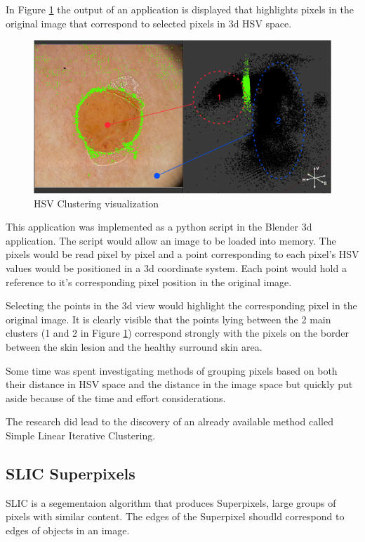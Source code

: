 In Figure \ref{fig:hsv_3d} the output of an application is displayed that highlights pixels in the original image that correspond to selected pixels in 3d HSV space.

\begin{figure}[H]
    \includegraphics[width=\textwidth,keepaspectratio]{assets/image_processing/hsv/hsv_space.pdf}
    \caption{HSV Clustering visualization}
    \label{fig:hsv_3d}
\end{figure}

This application was implemented as a python script in the Blender 3d application. The script would allow an image to be loaded into memory. The pixels would be read pixel by pixel and a point corresponding to each pixel's HSV values would be positioned in a 3d coordinate system. Each point would hold a reference to it's corresponding pixel position in the original image.

Selecting the points in the 3d view would highlight the corresponding pixel in the original image. It is clearly visible that the points lying between the 2 main clusters (1 and 2 in Figure \ref{fig:hsv_3d}) correspond strongly with the pixels on the border between the skin lesion and the healthy surround skin area.

Some time was spent investigating methods of grouping pixels based on both their distance in HSV space and the distance in the image space but quickly put aside because of the time and effort considerations.

The research did lead to the discovery of an already available method called Simple Linear Iterative Clustering.

\subsection{SLIC Superpixels}

SLIC is a segementaion algorithm that produces Superpixels, large groups of pixels with similar content. The edges of the Superpixel shoudld correspond to edges of objects in an image.

